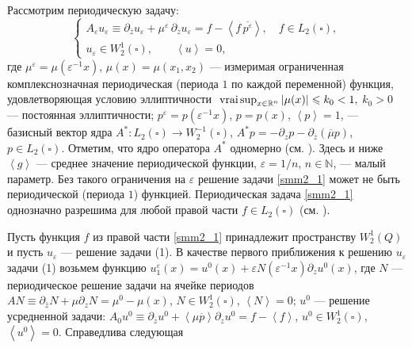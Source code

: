 
Рассмотрим периодическую задачу:
\begin{equation}\label{smm2_1}
   \left\{\begin{array}{l}
A_\varepsilon u_\varepsilon\equiv\partial_{\bar{z}}u_\varepsilon+\mu^{\varepsilon}\,\partial_z u_\varepsilon
=f-\left<f\,\overline{p^\varepsilon}\right>,\quad f\in L_2(\square), \\[3mm]
   u_\varepsilon\in W^1_2(\square),\qquad \left<u\right>=0,
\end{array}\right.
\end{equation}
где   $\mu^\varepsilon=\mu(\varepsilon^{-1}x)$, $\mu(x)=\mu(x_1,x_2)$
 --- измеримая ограниченная комплекснозначная периодическая
 (периода $1$ по каждой переменной)
функция, удовлетворяющая условию эллиптичности
$
    \textrm{ vrai\,sup}_{x\in \mathbb{R}^n}\left|\mu(x)\right|\leqslant k_0 <1,
$
 $k_0>0$ --- постоянная эллиптичности; $p^\varepsilon=p(\varepsilon^{-1}x)$,
$p=p(x)$, $\left\langle p\right\rangle=1$, --- базисный вектор ядра $A^\ast: L_2(\square)\to W^{-1}_2(\square)$, $A^* p=-\partial_z p-\partial_{\overline z} (\overline\mu p)$,      $p\in L_2 (\square )$.
Отметим, что ядро оператора $A^\ast$ одномерно (см. \cite{smm_ZhKO}).
Здесь
и ниже $\left\langle g\right\rangle$ --- среднее значение периодической функции, $\varepsilon=1/n$, $n\in \mathbb{N}$,
 --- малый параметр. Без такого ограничения на $\varepsilon$ решение задачи
 \eqref{smm2_1} может не быть периодической (периода $1$) функцией.
%
 Периодическая
 задача \eqref{smm2_1} однозначно разрешима для любой правой части
 $f\in L_2(\square)$ (см. \cite{smm_SDZ}).

 Пусть функция $f$ из правой части \eqref{smm2_1} принадлежит пространству $W_2^1(Q)$
и пусть $u_\varepsilon$ --- решение задачи (1).
В качестве первого приближения к решению $u_\varepsilon$  задачи  (1) возьмем   функцию
$
u_1^\varepsilon(x)=u^0(x)+\varepsilon N(\varepsilon^{-1}x)\partial_zu^0(x)$,
где $N$ --- периодическое решение задачи на ячейке периодов
$AN\equiv \partial_{\bar z}N+\mu\partial_z N=\mu^0-\mu(x)$,
$N\in W_2^{1}(\square)$, $\left\langle N\right\rangle=0$; $u^0$ --- решение усредненной задачи: $A_0u^0\equiv \partial_{\overline z}u^0+\left\langle\mu\overline p\right\rangle\partial_zu^0=f-\left\langle f\right\rangle$, $u^0\in W_2^1(\square)$,
$\left\langle u^0\right\rangle=0$. Справедлива следующая

